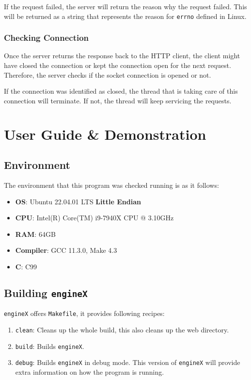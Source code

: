 \documentclass{homework}
\begin{document}
If the request failed, the server will return the reason why the request failed. This will be returned as a string that represents the reason for \texttt{errno} defined in Linux.

\subsubsection{Checking Connection}
Once the server returns the response back to the HTTP client, the client might have closed the connection or kept the connection open for the next request. Therefore, the server checks if the socket connection is opened or not.

If the connection was identified as closed, the thread that is taking care of this connection will terminate. If not, the thread will keep servicing the requests.
\pagebreak

\section{User Guide \& Demonstration}
\subsection{Environment}
The environment that this program was checked running is as it follows:
\begin{itemize}
    \item \textbf{OS}: Ubuntu 22.04.01 LTS \textbf{Little Endian}
    \item \textbf{CPU}: Intel(R) Core(TM) i9-7940X CPU @ 3.10GHz
    \item \textbf{RAM}: 64GB
    \item \textbf{Compiler}: GCC 11.3.0, Make 4.3
    \item \textbf{C}: C99
\end{itemize}

\subsection{Building \texttt{engineX}}
\texttt{engineX} offers \texttt{Makefile}, it provides following recipes:
\begin{enumerate}
    \item \texttt{clean}: Cleans up the whole build, this also cleans up the web directory.
    \item \texttt{build}: Builds \texttt{engineX}.
    \item \texttt{debug}: Builds \texttt{engineX} in debug mode. This version of \texttt{engineX} will provide extra information on how the program is running.
\end{enumerate}
\end{document}
